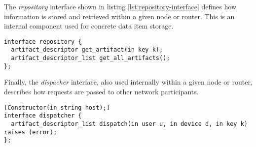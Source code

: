 The \emph{repository} interface shown in listing \ref{lst:repository-interface} defines how information is stored and retrieved within a given node or router.  This is an internal component used for concrete data item storage.

\begin{lstlisting}[language=idl, label=lst:repository-interface, caption=The Repository Interface]
interface repository {
  artifact_descriptor get_artifact(in key k);
  artifact_descriptor_list get_all_artifacts();
};
\end{lstlisting}

Finally, the \emph{dispacher} interface, also used internally within a given node or router, describes how requests are passed to other network participants.

\begin{lstlisting}[language=idl, label=lst:dispatcher-interface, caption=The Dispatcher Interface]
[Constructor(in string host);]
interface dispatcher {
  artifact_descriptor_list dispatch(in user u, in device d, in key k) raises (error);
};
\end{lstlisting}